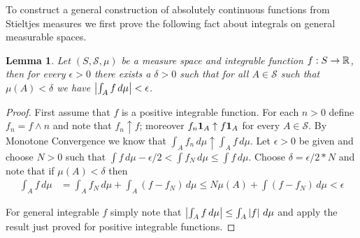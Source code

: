 \documentclass{amsart}
\newtheorem{lem}[thm]{Lemma}
\theoremstyle{remark}
\theoremstyle{definition}
\begin{document}
To construct a general construction of absolutely continuous functions
from Stieltjes measures we first prove the
following fact about integrals on general measurable spaces.

\begin{lem}\label{LimitOfIntegralAsMeasureGoesToZero}Let $(S, \mathcal{S}, \mu)$ be a measure space and
  integrable function $f:S \to \mathbb{R}$, then for
  every $\epsilon>0$ there exists a $\delta>0$ such that for all $A
  \in \mathcal{S}$ such that $\mu(A) < \delta$ we have $\left \vert \int_A f\,
  d\mu \right \vert < \epsilon$.
\end{lem}
\begin{proof}
First assume that $f$ is a positive integrable function.  For each $n
> 0$ define $f_n = f \wedge n$ and note that $f_n \uparrow f$;
moreover $f_n \textbf{1}_{A} \uparrow f \textbf{1}_{A}$ for
every $A \in \mathcal{S}$.  By
Monotone Convergence we know that $\int_A f_n \, d\mu \uparrow \int_A
f \, d\mu$.  Let $\epsilon > 0$ be given and choose $N > 0$ such that
$\int f \, d\mu - \epsilon/2 < \int f_N \, d\mu \leq \int f \, d\mu$.
Choose $\delta = \epsilon/2*N$ and note that if $\mu(A) < \delta$ then
\begin{align*}
\int_A f \, d\mu &= \int_A f_N \, d\mu + \int_A (f-f_N) \, d\mu \leq N
\mu(A) + \int (f-f_N) \, d\mu < \epsilon
\end{align*}

For general integrable $f$ simply note that $\left \vert \int_A f \, d\mu \right \vert
\leq \int_A \left \vert f \right \vert \, d\mu$ and apply the result just proved for
positive integrable functions.
\end{proof}
\end{document}

